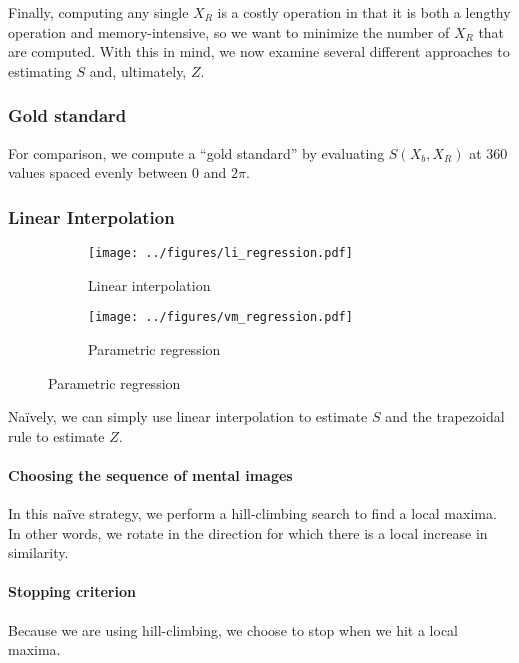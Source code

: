 \documentclass{article} %
\begin{document}
Finally, computing any single $X_R$ is a costly operation in that it
is both a lengthy operation and memory-intensive, so we want to
minimize the number of $X_R$ that are computed. With this in mind, we
now examine several different approaches to estimating $S$ and,
ultimately, $Z$.

\subsubsection{Gold standard}

For comparison, we compute a ``gold standard'' by evaluating $S(X_b,
X_R)$ at 360 values spaced evenly between $0$ and $2\pi$.

\subsubsection{Linear Interpolation}

\begin{figure}[t]
  \centering
  \begin{subfigure}[b]{0.45\textwidth}
    \centering
    \texttt{[image: ../figures/li\_regression.pdf]}
    \caption{Linear interpolation}
    \label{fig:li}
  \end{subfigure}
  \begin{subfigure}[b]{0.45\textwidth}
    \centering
    \texttt{[image: ../figures/vm\_regression.pdf]}
    \caption{Parametric regression}
    \label{fig:vm}
  \end{subfigure}
\end{figure}

Na\"ively, we can simply use linear interpolation to estimate $S$ and
the trapezoidal rule to estimate $Z$.

\paragraph{Choosing the sequence of mental images}

In this naïve strategy, we perform a hill-climbing search to find a
local maxima. In other words, we rotate in the direction for which
there is a local increase in similarity.

\paragraph{Stopping criterion}

Because we are using hill-climbing, we choose to stop when we hit a
local maxima.
\end{document}
